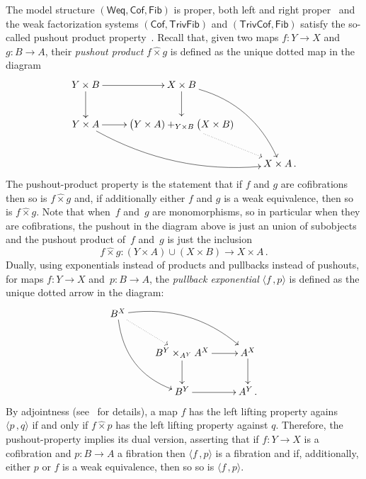 \documentclass[reqno,10pt,a4paper,oneside,draft]{amsart}
\numberwithin{equation}{section}
\theoremstyle{mythm}
\theoremstyle{mydef}
\theoremstyle{myrmk}
\newcommand{\ie}{\text{i.e.\ }}
\newcommand{\myemph}{\textit}
\newcommand{\co}{\colon}
\newcommand{\Weq}{\mathsf{Weq}}
\newcommand{\hattimes}{\mathbin{\hat{\times}}}
\newcommand{\Cof}{\mathsf{Cof}}
\newcommand{\TrivFib}{\mathsf{TrivFib}}
\newcommand{\Fib}{\mathsf{Fib}}
\newcommand{\TrivCof}{\mathsf{TrivCof}}
\begin{document}
\medskip

The model structure $(\Weq, \Cof, \Fib)$ is proper, \ie both left and right proper~\cite[Propositions 2.2.9 and 3.5.2]{henry2019qms}
and the weak factorization systems $(\Cof, \TrivFib)$ and $(\TrivCof, \Fib)$
satisfy the so-called pushout product property~\cite[Proposition 5.1.5 and Corollary 5.2.3]{henry2018wms}. Recall that, given two maps $f \co Y \rightarrow X$ and $g \co B \rightarrow A$, their \emph{pushout product} $f \hattimes g$ is defined as the unique dotted map in the diagram
\[
\xymatrix{
Y \times B \ar[r] \ar[d] &  X \times B \ar[d] \ar@/^1.5pc/[ddr] \\
Y \times A \ar[r]  \ar@/_1.5pc/[drr] & \displaystyle \big( Y \times A ) +_{Y \times B} \big( X \times B ) \ar@{.>}[dr]  \\
 & & X \times A \, . }
 \]
The pushout-product property is  the statement that  if $f$ and $g$ are cofibrations then so is $f \hattimes g$
and, if additionally either $f$ and $g$ is a weak equivalence, then so is $f \hattimes g$.
Note that when~$f$ and~$g$ are monomorphisms, so in particular when they are cofibrations, the pushout in the diagram above is just an union of subobjects and the pushout product of~$f$ and~$g$ is just the inclusion
\[  
f \hattimes g \co (Y \times A) \cup (X \times B) \rightarrow X \times A \, .
\]
Dually, using  exponentials instead of products and pullbacks instead of pushouts, for maps $f \co Y \rightarrow X$ and~$p \co B \rightarrow A$, the \myemph{pullback exponential}  $\langle f \, , p \rangle$ is defined as the unique dotted arrow in the diagram:
\[
\xymatrix{
 B^X \ar@{.>}[dr] \ar@/^1.5pc/[drr] \ar@/_1.5pc/[ddr] \\
& B^Y \times_{A^Y} A^X \ar[r] \ar[d] &  A^X \ar[d]  \\
& B^Y \ar[r] & A^Y  \, . \\
 }
 \]
By adjointness (see~\cite{joyal-tierney-segal} for details), a map $f$ has the left lifting property agains $\langle p \, , q \rangle $ if and only if $f \hattimes p$ has the left lifting property against $q$.
Therefore, the pushout-property  implies its dual version, asserting that  if $f \co Y \to X$ is a cofibration and $p \co B \to A$ a fibration then $\langle f \, , p \rangle$ is a fibration and if, additionally,  either $p$ or $f$ is a weak equivalence, then so so is $\langle f \, , p \rangle$.

\medskip
\end{document}
